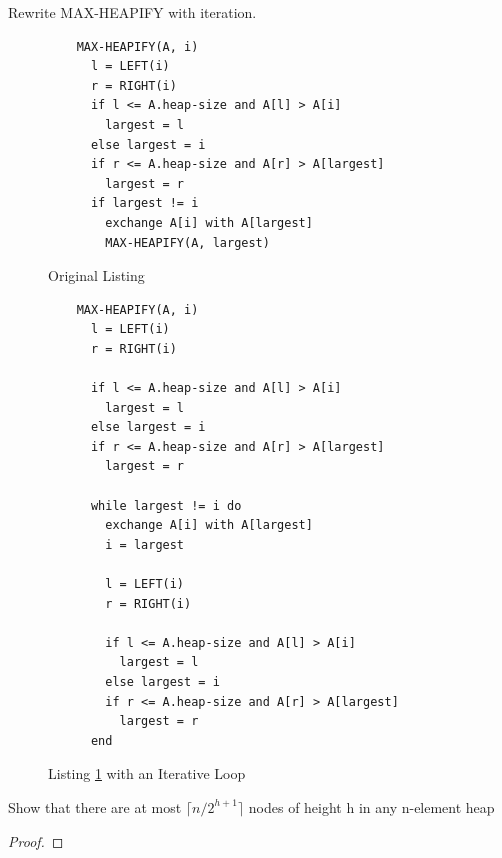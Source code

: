 \documentclass[12pt]{article}
\newenvironment{problem}[2][Problem]{\begin{trivlist}
\item[\hskip \labelsep {\bfseries #1}\hskip \labelsep {\bfseries #2.}]}{\end{trivlist}}
\begin{document}
\begin{problem}{6.2-5} Rewrite MAX-HEAPIFY with iteration. \\
\begin{figure}[h!]
  \centering
  \caption{Original Listing}
  \begin{lstlisting}
    MAX-HEAPIFY(A, i)
      l = LEFT(i)
      r = RIGHT(i)
      if l <= A.heap-size and A[l] > A[i]
        largest = l
      else largest = i
      if r <= A.heap-size and A[r] > A[largest]
        largest = r
      if largest != i
        exchange A[i] with A[largest]
        MAX-HEAPIFY(A, largest)
  \end{lstlisting}
  \label{fig:listing1}
\end{figure}

\begin{figure}[h!]
  \centering
  \caption{Listing \ref{fig:listing1} with an Iterative Loop}
  \begin{lstlisting}
    MAX-HEAPIFY(A, i)
      l = LEFT(i)
      r = RIGHT(i)

      if l <= A.heap-size and A[l] > A[i]
        largest = l
      else largest = i
      if r <= A.heap-size and A[r] > A[largest]
        largest = r

      while largest != i do
        exchange A[i] with A[largest]
        i = largest

        l = LEFT(i)
        r = RIGHT(i)

        if l <= A.heap-size and A[l] > A[i]
          largest = l
        else largest = i
        if r <= A.heap-size and A[r] > A[largest]
          largest = r
      end

  \end{lstlisting}
\end{figure}
\end{problem} \newpage

\begin{problem}{6.3-3} Show that there are at most $\lceil n/2^{h+1} \rceil$ nodes of height h in any n-element heap \\
  \begin{proof}
  \end{proof}
\end{problem}

\end{document}
